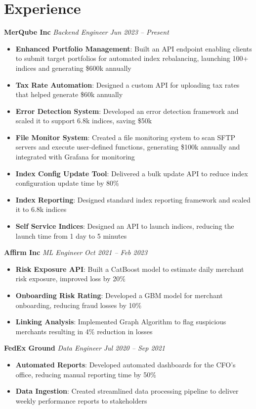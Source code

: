 \documentclass[letterpaper,10pt]{article}
\begin{document}
\section*{Experience}
\textbf{{MerQube Inc}} \textit{{Backend Engineer}} \hfill \textit{{Jun 2023 -- Present}}
\begin{itemize}
    \item \textbf{{Enhanced Portfolio Management}}: Built an API endpoint enabling clients to submit target portfolios for automated index rebalancing, launching 100+ indices and generating \$600k annually
    \item \textbf{{Tax Rate Automation}}: Designed a custom API for uploading tax rates that helped generate \$60k annually
    \item \textbf{{Error Detection System}}: Developed an error detection framework and scaled it to support 6.8k indices, saving \$50k
    \item \textbf{{File Monitor System}}: Created a file monitoring system to scan SFTP servers and execute user-defined functions, generating \$100k annually and integrated with Grafana for monitoring
    \item \textbf{{Index Config Update Tool}}: Delivered a bulk update API to reduce index configuration update time by 80\%
    \item \textbf{{Index Reporting}}: Designed standard index reporting framework and scaled it to 6.8k indices
    \item \textbf{{Self Service Indices}}: Designed an API to launch indices, reducing the launch time from 1 day to 5 minutes
\end{itemize}
\textbf{{Affirm Inc}} \textit{{ML Engineer}} \hfill \textit{{Oct 2021 -- Feb 2023}}
\begin{itemize}
    \item \textbf{{Risk Exposure API}}: Built a CatBoost model to estimate daily merchant risk exposure, improved loss by 20\%
    \item \textbf{{Onboarding Risk Rating}}: Developed a GBM model for merchant onboarding, reducing fraud losses by 10\%
    \item \textbf{{Linking Analysis}}: Implemented Graph Algorithm to flag suspicious merchants resulting in 4\% reduction in losses
\end{itemize}
\textbf{{FedEx Ground}} \textit{{Data Engineer}} \hfill \textit{{Jul 2020 -- Sep 2021}}
\begin{itemize}
    \item \textbf{{Automated Reports}}: Developed automated dashboards for the CFO’s office, reducing manual reporting time by 50\%
    \item \textbf{{Data Ingestion}}: Created streamlined data processing pipeline to deliver weekly performance reports to stakeholders
\end{itemize}
\end{document}
